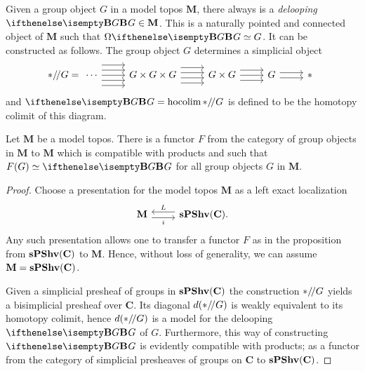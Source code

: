 Given a group object \(G\) in a model topos \(\mathbf M\), there
always is a \emph{delooping} \(\deloop{G}\in\mathbf M\). This is a naturally pointed
and connected object of \(\mathbf M\) such that \(\Omega\deloop{G} \simeq
G\). It can be constructed as follows. The group object
\(G\) determines a simplicial object
\[
  \actgrp{*}{G} = \begin{tikzcd}
    \cdots \arrow[r, shift left=2.4ex] \arrow[r, shift left=1.2ex] \arrow[r]
    \arrow[r, shift left=-1.2ex] \arrow[r, shift left=-2.4ex] & G\times G\times G \arrow[r, shift left=1.8ex] \arrow[r, shift
    left=.6ex] \arrow[r, shift left=-.6ex] \arrow[r, shift left=-1.8ex] & G\times G \arrow[r, shift left=1.2ex] \arrow[r]
    \arrow[r, shift left=-1.2ex] & G \arrow[r, shift left=.6ex]
    \arrow[r, shift left=-.6ex] & *
  \end{tikzcd}
\]
and \(\deloop{G} = \hocolim \actgrp{*}{G}\) is defined to be the
homotopy colimit of this diagram.

\begin{proposition}\label{prop:deloop-products}
  Let \(\mathbf M\) be a model topos. There is a functor \(F\) from the category
  of group objects in \(\mathbf M\) to \(\mathbf M\) which is compatible with
  products and such that \(F(G)\simeq\deloop{G}\) for all group objects \(G\) in
  \(\mathbf M\).
\end{proposition}

\begin{proof}
  Choose a presentation for the model topos \(\mathbf M\) as a left exact
  localization
  \[
    \begin{tikzcd}
      \mathbf M \arrow[r, shift right=.7ex, "i"'] & \arrow[l, shift right=.7ex,
      "L"'] \spshv(\mathbf C).
    \end{tikzcd}
  \]
  Any such presentation allows one to transfer a functor \(F\) as in the
  proposition from \(\operatorname{\textnormal{\bfseries sPShv}}(\mathbf C)\) to \(\mathbf M\). Hence, without loss
  of generality, we can assume \(\mathbf M = \operatorname{\textnormal{\bfseries sPShv}}(\mathbf C)\).

  Given a simplicial presheaf of groups in \(\operatorname{\textnormal{\bfseries sPShv}}(\mathbf C)\) the
  construction \(*/\!/G\) yields a bisimplicial presheaf over \(\mathbf
  C\). Its diagonal \(d(*/\!/G)\) is weakly equivalent to its homotopy
  colimit, hence \(d(*/\!/G)\) is a model
  for the delooping \(\deloop{G}\) of \(G\). Furthermore, this way of
  constructing \(\deloop{G}\) is evidently compatible with products; as a functor from the category of simplicial presheaves
  of groups on \(\mathbf C\) to \(\operatorname{\textnormal{\bfseries sPShv}}(\mathbf C)\).
\end{proof}

